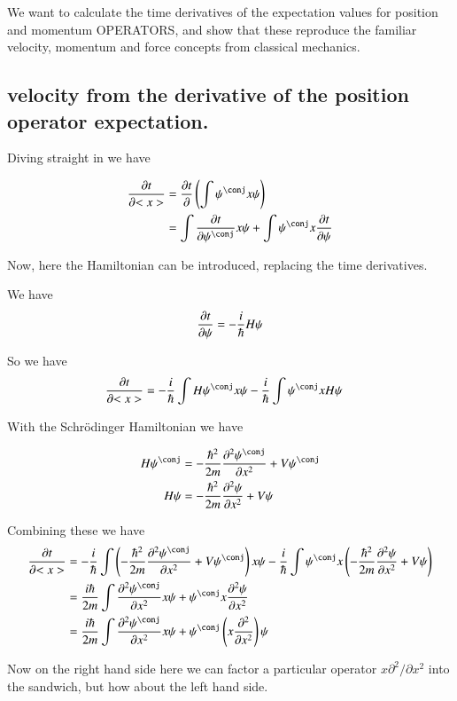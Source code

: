 \documentclass{article}
\newcommand{\PDSq}[2]{\frac{\partial^2 {#2}}{\partial {#1}^2}}
\begin{document}
We want to calculate the time derivatives of the expectation values
for position and momentum OPERATORS, and show that these reproduce the
familiar velocity, momentum and force concepts from classical mechanics.

\subsection{ velocity from the derivative of the position operator expectation. }

Diving straight in we have

\begin{align*}
\PD{t}{<x>}
&= \PD{t}{} \left( \int \psi^\conj x \psi \right) \\
&= \int \PD{t}{\psi^\conj} x \psi + \int \psi^\conj x \PD{t}{\psi} 
\end{align*}

Now, here the Hamiltonian can be introduced, replacing the time derivatives.

We have
\begin{align*}
\frac{\partial{t}}{\partial {\psi}} &= -\frac{i}{\hbar} H \psi \\
\end{align*}

So we have
\begin{align*}
\PD{t}{<x>}
&= -\frac{i}{\hbar} \int H {\psi^\conj} x \psi - \frac{i}{\hbar}\int \psi^\conj x H {\psi} 
\end{align*}

With the Schr\"{o}dinger Hamiltonian we have

\begin{align*}
H \psi^\conj &= - \frac{\hbar^2}{2m} \PDSq{x}{\psi^\conj} + V\psi^\conj \\
H \psi &= - \frac{\hbar^2}{2m} \PDSq{x}{\psi} + V\psi \\
\end{align*}

Combining these we have
\begin{align*}
\PD{t}{<x>}
&= 
-\frac{i}{\hbar} \int \left( - \frac{\hbar^2}{2m} \PDSq{x}{\psi^\conj} + V\psi^\conj \right) x \psi 
-\frac{i}{\hbar} \int \psi^\conj x \left(- \frac{\hbar^2}{2m} \PDSq{x}{\psi} + V\psi \right) \\
&= \frac{i\hbar}{2m} \int \PDSq{x}{\psi^\conj} x \psi + \psi^\conj x \PDSq{x}{\psi}  \\
&= \frac{i\hbar}{2m} \int \PDSq{x}{\psi^\conj} x \psi + \psi^\conj \left(x \PDSq{x}{}\right) {\psi}  \\
\end{align*}

Now on the right hand side here we can factor a particular operator $x \partial^2/{\partial x^2}$ into the sandwich, but how about the left
hand side.



\end{document}
